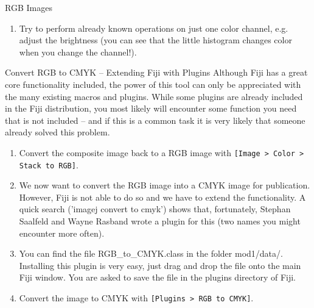 \begin{taskbox}{RGB Images}
\begin{enumerate}
		\begin{minipage}[t]{\linewidth}
		\begin{center}
		\medskip
		\label{fig:channels-tool-dialog}
		\end{center}
	\end{minipage}
	
	\item Try to perform already known operations on just one color channel, e.g. adjust the brightness (you can see that the little histogram changes color when you change the channel!).
\end{enumerate}

\end{taskbox}

\newpage
\begin{taskbox}{Convert RGB to CMYK -- Extending Fiji with Plugins}
Although Fiji has a great core functionality included, the power of this tool can only be appreciated with the many existing macros and plugins. While some plugins are already included in the Fiji distribution, you most likely will encounter some function you need that is not included -- and if this is a common task it is very likely that someone already solved this problem. 

\begin{enumerate}
	\item Convert the composite image back to a RGB image with \texttt{[Image > Color > Stack to RGB]}.
	\item We now want to convert the RGB image into a CMYK image for publication. However, Fiji is not able to do so and we have to extend the functionality. A quick search ('imagej convert to cmyk') shows that, fortunately, Stephan Saalfeld and Wayne Rasband wrote a plugin for this (two names you might encounter more often).
	\item You can find the file RGB\_to\_CMYK.class in the folder mod1/data/. Installing this plugin is very easy, just drag and drop the file onto the main Fiji window. You are asked to save the file in the plugins directory of Fiji. 
	\item Convert the image to CMYK with \texttt{[Plugins > RGB to CMYK]}.
\end{enumerate}

\end{taskbox}

